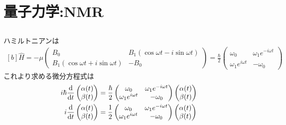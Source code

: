 \documentclass[../ap_2022.tex]{subfiles}
\begin{document}
\setcounter{chapter}{0}
\chapter{量子力学:NMR}
\section{}
\subsection{}
ハミルトニアンは
\begin{equation}\begin{aligned}[b]
    \hat{H} = -\mu\begin{pmatrix}
        B_0 & B_1(\cos\omega t-i\sin\omega t)\\
        B_1(\cos\omega t+i\sin\omega t) & -B_0
    \end{pmatrix}
    =\frac{\hbar}{2}\begin{pmatrix}
        \omega_0 & \omega_1 e^{-i\omega t}\\
        \omega_1 e^{i\omega t} & -\omega_0
    \end{pmatrix}
\end{aligned}\end{equation}
これより求める微分方程式は
\begin{equation}\begin{aligned}[b]
    i\hbar\dv{t}\begin{pmatrix}
        \alpha(t)\\
        \beta(t)
    \end{pmatrix}
    &=\frac{\hbar}{2}\begin{pmatrix}
        \omega_0 & \omega_1 e^{-i\omega t}\\
        \omega_1 e^{i\omega t} & -\omega_0
    \end{pmatrix}\begin{pmatrix}
        \alpha(t)\\
        \beta(t)
    \end{pmatrix}\\
    i\dv{t}\begin{pmatrix}
        \alpha(t)\\
        \beta(t)
    \end{pmatrix}
    &=\frac{1}{2}\begin{pmatrix}
        \omega_0 & \omega_1 e^{-i\omega t}\\
        \omega_1 e^{i\omega t} & -\omega_0
    \end{pmatrix}\begin{pmatrix}
        \alpha(t)\\
        \beta(t)
    \end{pmatrix}
\end{aligned}\end{equation}
\end{document}
